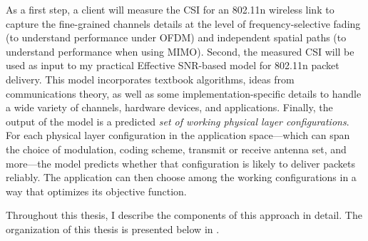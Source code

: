 As a first step, a client will measure the CSI for an 802.11n wireless link to capture the fine-grained channels details at the level of frequency-selective fading (to understand performance under OFDM) and independent spatial paths (to understand performance when using MIMO). Second, the measured CSI will be used as input to my practical Effective SNR-based model for 802.11n packet delivery. This model incorporates textbook algorithms, ideas from communications theory, as well as some implementation-specific details to handle a wide variety of channels, hardware devices, and applications. Finally, the output of the model is a predicted \emph{set of working physical layer configurations}. For each physical layer configuration in the application space---which can span the choice of modulation, coding scheme, transmit or receive antenna set, and more---the model predicts whether that configuration is likely to deliver packets reliably. The application can then choose among the working configurations in a way that optimizes its objective function.

Throughout this thesis, I describe the components of this approach in detail. The organization of this thesis is presented below in .




